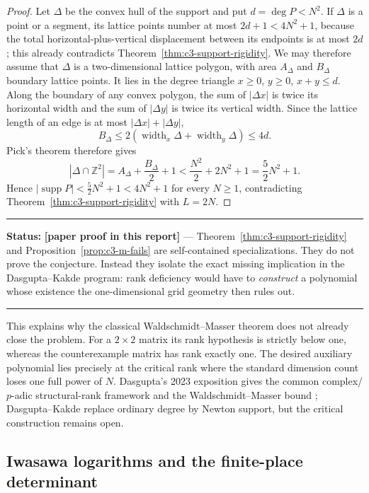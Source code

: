 \documentclass[11pt,oneside]{article}
\theoremstyle{definition}
\theoremstyle{remark}
\newcommand{\Z}{\mathbb Z}
\newcommand{\statusnew}{\textcolor{newgreen}{\textbf{[paper proof in this report]}}}
\newcommand{\supp}{\operatorname{supp}}
\newenvironment{statusbox}[1]
{\begin{center}\begin{minipage}{0.94\textwidth}\raggedright\hbadness=10000\hrule
\vspace{0.45em}\textbf{Status:} #1\par\vspace{0.35em}}
{\vspace{0.35em}\hrule\end{minipage}\end{center}}
\begin{document}
\begin{proof}
Let $\Delta$ be the convex hull of the support and put $d=\deg P<N^2$.  If $\Delta$ is a
point or a segment, its lattice points number at most $2d+1<4N^2+1$, because the total
horizontal-plus-vertical displacement between its endpoints is at most $2d$; this already
contradicts Theorem~\ref{thm:c3-support-rigidity}.  We may therefore assume that $\Delta$ is a
two-dimensional lattice polygon, with area $A_\Delta$ and $B_\Delta$ boundary lattice points.
It lies in the degree triangle $x\ge0$, $y\ge0$, $x+y\le d$.  Along the boundary of any convex polygon,
the sum of $|\Delta x|$ is twice its horizontal width and the sum of $|\Delta y|$ is twice its
vertical width.  Since the lattice length of an edge is at most $|\Delta x|+|\Delta y|$,
\[
 B_\Delta\le2(\operatorname{width}_x\Delta+\operatorname{width}_y\Delta)\le4d.
\]
Pick's theorem therefore gives
\[
 |\Delta\cap\Z^2|
 =A_\Delta+\frac{B_\Delta}{2}+1
 <\frac{N^2}{2}+2N^2+1
 =\frac52N^2+1.
\]
Hence $|\supp P|<\frac52N^2+1<4N^2+1$ for every $N\ge1$, contradicting
Theorem~\ref{thm:c3-support-rigidity} with $L=2N$.
\end{proof}

\begin{statusbox}{\statusnew{} --- Theorem~\ref{thm:c3-support-rigidity} and
Proposition~\ref{prop:c3-m-fails} are self-contained specializations.  They do not prove the
conjecture.  Instead they isolate the exact missing implication in the Dasgupta--Kakde
program: rank deficiency would have to \emph{construct} a polynomial whose existence the
one-dimensional grid geometry then rules out.}
\end{statusbox}

This explains why the classical Waldschmidt--Masser theorem does not already close the
problem.  For a $2\times2$ matrix its rank hypothesis is strictly below one, whereas the
counterexample matrix has rank exactly one.  The desired auxiliary polynomial lies precisely
at the critical rank where the standard dimension count loses one full power of $N$.
Dasgupta's 2023 exposition gives the common complex/$p$-adic structural-rank framework and the
Waldschmidt--Masser bound \cite{Dasgupta2023}; Dasgupta--Kakde replace ordinary degree by
Newton support, but the critical construction remains open.

\subsection{Iwasawa logarithms and the finite-place determinant}
\label{sec:c3-local-determinant}
\end{document}
